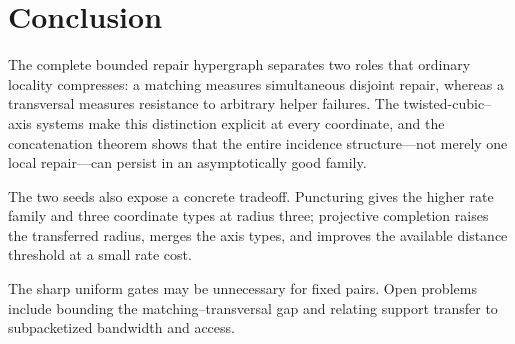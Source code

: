 \documentclass[11pt]{article}
\theoremstyle{definition}
\theoremstyle{remark}
\begin{document}
\enlargethispage{2\baselineskip}
\section{Conclusion}

The complete bounded repair hypergraph separates two roles that ordinary
locality compresses: a matching measures simultaneous disjoint repair,
whereas a transversal measures resistance to arbitrary helper failures.
The twisted-cubic--axis systems make this distinction explicit at every
coordinate, and the concatenation theorem shows that the entire incidence
structure---not merely one local repair---can persist in an asymptotically
good family.

The two seeds also expose a concrete tradeoff.  Puncturing gives the higher
rate family and three coordinate types at radius three; projective completion
raises the transferred radius, merges the axis types, and improves the
available distance threshold at a small rate cost.

The sharp uniform gates may be unnecessary for fixed pairs.  Open problems
include bounding the matching--transversal gap and relating support transfer
to subpacketized bandwidth and access.



\end{document}
